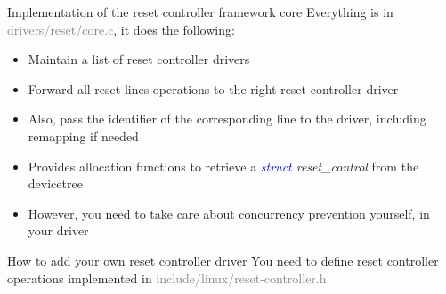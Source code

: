 \documentclass{beamer}
\begin{document}
\begin{frame}{Implementation of the reset controller framework core}
	Everything is in \textcolor{gray}{drivers/reset/core.c}, it does the following:
	\begin{itemize}
		\item Maintain a list of reset controller drivers
		\item Forward all reset lines operations to the right reset controller driver
		\item Also, pass the identifier of the corresponding line to the driver, including remapping if needed
		\item Provides allocation functions to retrieve a \textit{\textcolor{blue}{struct} reset\_control} from the devicetree
		\item However, you need to take care about concurrency prevention yourself, in your driver
	\end{itemize}
\end{frame}

\begin{frame}{How to add your own reset controller driver}
	You need to define reset controller operations implemented in \textcolor{gray}{include/linux/reset-controller.h}
	
\end{frame}
\end{document}
